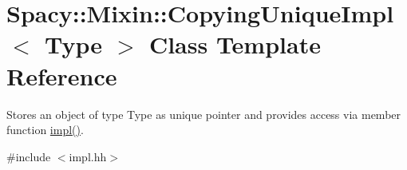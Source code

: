 \hypertarget{classSpacy_1_1Mixin_1_1CopyingUniqueImpl}{}\section{Spacy\+:\+:Mixin\+:\+:Copying\+Unique\+Impl$<$ Type $>$ Class Template Reference}
\label{classSpacy_1_1Mixin_1_1CopyingUniqueImpl}


Stores an object of type Type as unique pointer and provides access via member function \hyperlink{classSpacy_1_1Mixin_1_1CopyingUniqueImpl_ab7cc202fd000ba1753ef8596c09dc803}{impl()}.  




{\ttfamily \#include $<$impl.\+hh$>$}


